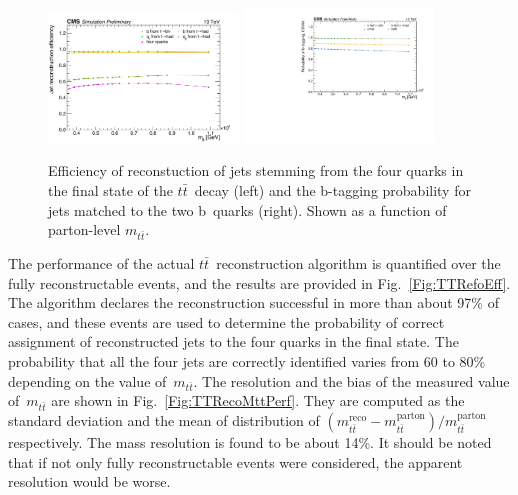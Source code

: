 \begin{figure}
  \centering
  \includegraphics[width=0.45\textwidth]{fig/chapt5/perf/matching.pdf}
  \includegraphics[width=0.45\textwidth]{fig/chapt5/perf/btag.pdf}
  \caption{Efficiency of reconstuction of jets stemming from the four quarks in the final state of the $t\bar t$~decay (left) and the b-tagging probability for jets matched to the two b~quarks (right). Shown as a function of parton-level $m_{t\bar t}$.}
  \label{Fig:TTRecoPartonMatch}
\end{figure}

The performance of the actual $t\bar t$~reconstruction algorithm is quantified over the fully reconstructable events, and the results are provided in Fig.~\ref{Fig:TTRefoEff}.
The algorithm declares the reconstruction successful in more than about 97\% of cases, and these events are used to determine the probability of correct assignment of reconstructed jets to the four quarks in the final state.
The probability that all the four jets are correctly identified varies from 60 to 80\% depending on the value of~$m_{t\bar t}$.
The resolution and the bias of the measured value of~$m_{t\bar t}$ are shown in Fig.~\ref{Fig:TTRecoMttPerf}.
They are computed as the standard deviation and the mean of distribution of $(m_{t\bar t}^\text{reco} - m_{t\bar t}^\text{parton}) / m_{t\bar t}^\text{parton}$ respectively.
The mass resolution is found to be about 14\%.
It should be noted that if not only fully reconstructable events were considered, the apparent resolution would be worse.

